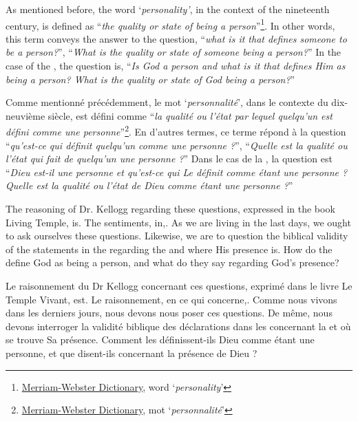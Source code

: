 As mentioned before, the word ‘\textit{personality’}, in the context of the nineteenth century, is defined as “\textit{the quality or state of being a person}”\footnote{\href{https://www.merriam-webster.com/dictionary/personality}{Merriam-Webster Dictionary}, word ‘\textit{personality}’}. In other words, this term conveys the answer to the question, “\textit{what is it that defines someone to be a person?}”, “\textit{What is the quality or state of someone being a person?}” In the case of the , the question is, “\textit{Is God a person and what is it that defines Him as being a person? What is the quality or state of God being a person?}”


Comme mentionné précédemment, le mot ‘\textit{personnalité}’, dans le contexte du dix-neuvième siècle, est défini comme “\textit{la qualité ou l'état par lequel quelqu'un est défini comme une personne}”\footnote{\href{https://www.merriam-webster.com/dictionary/personality}{Merriam-Webster Dictionary}, mot ‘\textit{personnalité}’}. En d'autres termes, ce terme répond à la question “\textit{qu'est-ce qui définit quelqu'un comme une personne ?}”, “\textit{Quelle est la qualité ou l'état qui fait de quelqu'un une personne ?}” Dans le cas de la , la question est “\textit{Dieu est-il une personne et qu'est-ce qui Le définit comme étant une personne ? Quelle est la qualité ou l'état de Dieu comme étant une personne ?}”


The reasoning of Dr. Kellogg regarding these questions, expressed in the book Living Temple, is. The sentiments, in,. As we are living in the last days, we ought to ask ourselves these questions. Likewise, we are to question the biblical validity of the statements in the  regarding the  and where His presence is. How do the  define God as being a person, and what do they say regarding God’s presence?


Le raisonnement du Dr Kellogg concernant ces questions, exprimé dans le livre Le Temple Vivant, est. Le raisonnement, en ce qui concerne,. Comme nous vivons dans les derniers jours, nous devons nous poser ces questions. De même, nous devons interroger la validité biblique des déclarations dans les  concernant la  et où se trouve Sa présence. Comment les  définissent-ils Dieu comme étant une personne, et que disent-ils concernant la présence de Dieu ?


